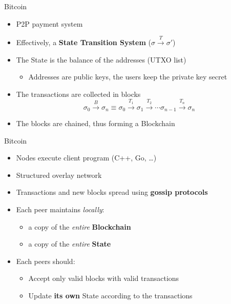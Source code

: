 
\begin{frame}{Bitcoin~\cite{nakamoto2008bitcoin}}
    \begin{itemize}
        \item P2P payment system
        \item Effectively, a \textbf{State Transition System} ($\sigma \xrightarrow{T} \sigma'$)
        \item The State is the balance of the
        addresses (UTXO list)
            \begin{itemize}
            \item Addresses are public keys, the users keep the private key secret
            \end{itemize}
        \item The transactions are collected in blocks
        $$
        \sigma_{0} \xrightarrow{B} \sigma_n \equiv 
        \sigma_{0} \xrightarrow{T_1} \sigma_1 \xrightarrow{T_2} \cdots
        \sigma_{n-1} \xrightarrow{T_n} \sigma_{n}
        $$
        \item The blocks are chained, thus forming a Blockchain 
    \end{itemize}
\end{frame}

\begin{frame}{Bitcoin~\cite{nakamoto2008bitcoin}}
\begin{itemize}
    \item Nodes execute client program (C++, Go, \dots)
    \item Structured overlay network
    \item Transactions and new blocks spread using \textbf{gossip protocols}
    \item Each peer maintains \emph{locally}:
    \begin{itemize} 
        \item a copy of the \emph{entire} \textbf{Blockchain}
        \item a copy of the \emph{entire} \textbf{State}
    \end{itemize}
    
    \item Each peers should:
    \begin{itemize}
        \item Accept only valid blocks with valid transactions
        \item Update \textbf{its own} State according to the transactions
    \end{itemize}
\end{itemize}

\end{frame}



